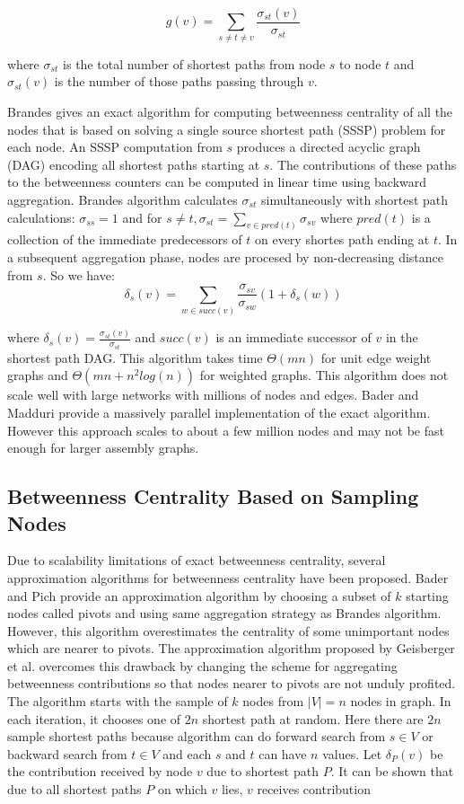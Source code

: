 \documentclass[runningheads,a4paper]{llncs}
\begin{document}
$$g(v) = \sum_{s \neq t \neq v} \frac{\sigma_{st}(v)}{\sigma_{st}}$$

where $\sigma_{st}$ is the total number of shortest paths from node $s$ to node $t$ and $\sigma_{st}(v)$ is the number of those paths passing through $v$.

Brandes\cite{brandes} gives an exact algorithm for computing betweenness centrality of all the nodes that is based on solving a single source shortest path (SSSP) problem for each node. An SSSP computation from $s$ produces a directed acyclic graph (DAG) encoding all shortest paths starting at $s$.   The contributions of these paths to the betweenness counters can be computed in linear time using backward aggregation. Brandes algorithm calculates $\sigma_{st}$  simultaneously with shortest path calculations: $\sigma_{ss} = 1$ and for $s \neq t, \sigma_{st} = \sum_{v \in pred(t)} \sigma_{sv}$ where $pred(t)$ is a collection of the immediate predecessors of  $t$ on every shortes path ending at $t$. In a subsequent aggregation phase, nodes are procesed by non-decreasing distance from $s$. So we have: 
$$\delta_{s}(v) = \sum_{w \in succ(v)} \frac{\sigma_{sv}}{\sigma_{sw}}(1+\delta_{s}(w))$$

where $\delta_{s}(v) = \frac{\sigma_{st}(v)}{\sigma_{st}}$ and $succ(v)$ is an immediate successor of $v$  in the shortest path DAG.   
This algorithm takes time $\Theta(mn)$ for unit edge weight graphs and $\Theta(mn + n^{2}log(n))$ for weighted graphs. This algorithm does not scale well with large networks with millions of nodes and edges. Bader and Madduri\cite{bader} provide a massively parallel implementation of the exact algorithm. However this approach scales to about a few million nodes and may not be fast enough for larger assembly graphs. 

\subsection*{Betweenness Centrality Based on Sampling Nodes}
Due to scalability limitations of exact betweenness centrality, several approximation algorithms for betweenness centrality have been proposed. Bader and Pich\cite{bp} provide an approximation algorithm by choosing a subset of $k$ starting nodes called pivots and using same aggregation strategy as Brandes algorithm. However, this algorithm overestimates the centrality of some unimportant nodes which are nearer to pivots. The approximation algorithm proposed by Geisberger et al. \cite{sanders} overcomes this drawback by changing the scheme for aggregating betweenness contributions so that nodes nearer to pivots are not unduly profited. The algorithm starts with the sample of $k$ nodes from $|V| = n$ nodes in graph. In each iteration, it chooses one of $2n$ shortest path at random. Here there are $2n$ sample shortest paths because algorithm can do forward search from $s \in V$ or backward search from $t \in V$ and each $s$ and $t$ can have $n$ values. Let $\delta_{P}(v)$ be the contribution received by node $v$ due to shortest path $P$. It can be shown that \cite{sanders} due to all shortest paths $P$ on which $v$ lies, $v$ receives contribution 
\end{document}
